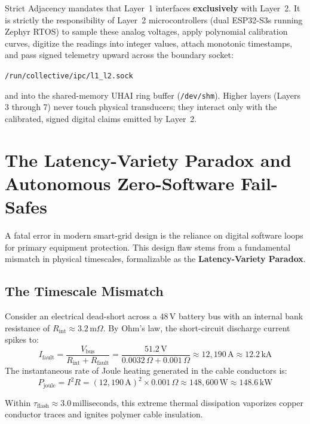 Strict Adjacency mandates that Layer~1 interfaces \textbf{exclusively} with Layer~2. It is strictly the responsibility of Layer~2 microcontrollers (dual ESP32-S3s running Zephyr RTOS) to sample these analog voltages, apply polynomial calibration curves, digitize the readings into integer values, attach monotonic timestamps, and pass signed telemetry upward across the boundary socket:
\begin{center}
\texttt{/run/collective/ipc/l1\_l2.sock}
\end{center}
and into the shared-memory UHAI ring buffer (\texttt{/dev/shm}). Higher layers (Layers 3 through 7) never touch physical transducers; they interact only with the calibrated, signed digital claims emitted by Layer~2.

\section{The Latency-Variety Paradox and Autonomous Zero-Software Fail-Safes}

A fatal error in modern smart-grid design is the reliance on digital software loops for primary equipment protection. This design flaw stems from a fundamental mismatch in physical timescales, formalizable as the \textbf{Latency-Variety Paradox}.

\subsection{The Timescale Mismatch}

Consider an electrical dead-short across a $48\,\mathrm{V}$ battery bus with an internal bank resistance of $R_{\mathrm{int}} \approx 3.2\,\mathrm{m}\Omega$. By Ohm's law, the short-circuit discharge current spikes to:
\begin{equation}
I_{\mathrm{fault}} = \frac{V_{\mathrm{bus}}}{R_{\mathrm{int}} + R_{\mathrm{fault}}} = \frac{51.2\,\mathrm{V}}{0.0032\,\Omega + 0.001\,\Omega} \approx 12,190\,\mathrm{A} \approx 12.2\,\mathrm{kA}
\label{eq:short_circuit_current}
\end{equation}
The instantaneous rate of Joule heating generated in the cable conductors is:
\begin{equation}
P_{\mathrm{joule}} = I^2 R = (12,190\,\mathrm{A})^2 \times 0.001\,\Omega \approx 148,600\,\mathrm{W} \approx 148.6\,\mathrm{kW}
\label{eq:joule_heating}
\end{equation}

Within $\tau_{\mathrm{flash}} \approx 3.0\,\mathrm{milliseconds}$, this extreme thermal dissipation vaporizes copper conductor traces and ignites polymer cable insulation.

